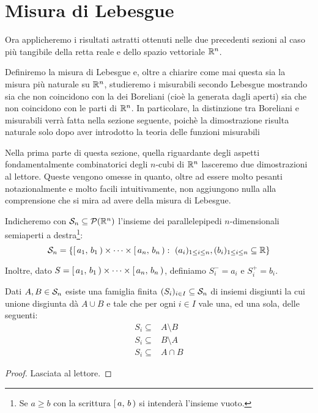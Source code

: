 \section{Misura di Lebesgue}
Ora applicheremo i risultati astratti ottenuti nelle due precedenti sezioni al caso più tangibile della retta reale e dello spazio vettoriale $\R^n$.

Definiremo la misura di Lebesgue e, oltre a chiarire come mai questa sia la misura più naturale su $\R^n$, studieremo i misurabili secondo Lebesgue mostrando sia che non coincidono con la \sigalg{} dei Boreliani (cioè la \sigalg{} generata dagli aperti) sia che non coincidono con le parti di $\R^n$.
In particolare, la distinzione tra Boreliani e misurabili verrà fatta nella sezione seguente, poichè la dimostrazione risulta naturale solo dopo aver introdotto la teoria delle funzioni misurabili

Nella prima parte di questa sezione, quella riguardante degli aspetti fondamentalmente combinatorici degli $n$-cubi di $\R^n$ lasceremo due dimostrazioni al lettore.
Queste vengono omesse in quanto, oltre ad essere molto pesanti notazionalmente e molto facili intuitivamente, non aggiungono nulla alla comprensione che si mira ad avere della misura di Lebesgue.


\begin{definition}\label{def:LebesgueSemiaperti}
	Indicheremo con $\S_n\subseteq\mathcal P(\R^n)$ l'insieme dei parallelepipedi $n$-dimensionali semiaperti a destra\footnote{Se $a\ge b$ con la scrittura $\co{a}{b}$ si intenderà l'insieme vuoto.}:
	\begin{equation*}
		\S_n=\left\{\co{a_1}{b_1}\times\cdots\times\co{a_n}{b_n}:\ (a_i)_{1\le i\le n},(b_i)_{1\le i\le n}\subseteq \R\right\}
	\end{equation*}
	
	Inoltre, dato $S=\co{a_1}{b_1}\times\cdots\times\co{a_n}{b_n}$, definiamo $S^-_i=a_i$ e $S^+_i=b_i$.
\end{definition}

\begin{proposition}\label{prop:SpaccareUnioneSemiaperti}
	Dati $A,B\in\S_n$ esiste una famiglia finita $(S_i)_{i\in I}\subseteq\S_n$ di insiemi disgiunti la cui unione disgiunta dà $A\cup B$ e tale che per ogni $i\in I$ vale una, ed una sola, delle seguenti:
	\begin{align*}
		S_i\subseteq &A\setminus B\\
		S_i\subseteq &B\setminus A\\
		S_i\subseteq &A\cap B
	\end{align*}
\end{proposition}
\begin{proof}
	Lasciata al lettore.
\end{proof}


